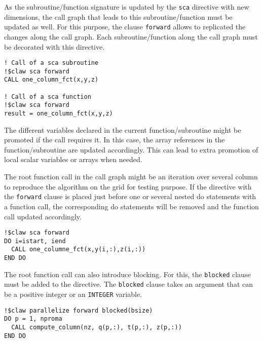 As the subroutine/function signature is updated by the \lstinline!sca!
directive with new dimensions, the call graph that leads to this
subroutine/function must be updated as well. For this purpose, the clause
\lstinline!forward! allows to replicated the changes along the call graph.
Each subroutine/function along the call graph must be decorated with this
directive.

\begin{lstlisting}
! Call of a sca subroutine
!$claw sca forward
CALL one_column_fct(x,y,z)

! Call of a sca function
!$claw sca forward
result = one_column_fct(x,y,z)
\end{lstlisting}

The different variables declared in the current function/subroutine might be
promoted if the call requires it. In this case, the array references in
the function/subroutine are updated accordingly. This can lead to extra
promotion of local scalar variables or arrays when needed.

The root function call in the call graph might be an iteration over several
column to reproduce the algorithm on the grid for testing purpose. If the
directive with the \lstinline!forward! clause is placed just before one or
several nested do statements with a function call, the corresponding do
statements will be removed and the function call updated accordingly.

\begin{lstlisting}
!$claw sca forward
DO i=istart, iend
  CALL one_columne_fct(x,y(i,:),z(i,:))
END DO
\end{lstlisting}

The root function call can also introduce blocking. For this, 
the \lstinline|blocked| clause must be added to the directive. 
The \lstinline|blocked| clause takes an argument that can be a positive integer
or an \lstinline|INTEGER| variable.


\begin{lstlisting}
!$claw parallelize forward blocked(bsize)
DO p = 1, nproma     
  CALL compute_column(nz, q(p,:), t(p,:), z(p,:))                                                                                             
END DO 
\end{lstlisting}

